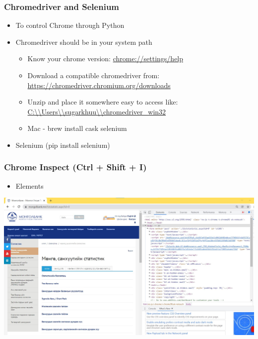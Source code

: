 \documentclass{beamer}
\begin{document}
\begin{frame}
\frametitle{Chromedriver and Selenium}
    \begin{itemize}
        \item To control Chrome through Python
        \item Chromedriver should be in your system path
            \begin{itemize}
                \item Know your chrome version: \url{chrome://settings/help}
                \item Download a compatible chromedriver from: \url{https://chromedriver.chromium.org/downloads}
                \item Unzip and place it somewhere easy to access like: \url{C:\\Users\\sugarkhuu\\chromedriver\_win32}
                \item Mac - brew install cask selenium
            \end{itemize}
        \item Selenium (pip install selenium)
    \end{itemize}
\end{frame}

\begin{frame}
    \frametitle{Chrome Inspect (Ctrl + Shift + I)}
        \begin{itemize}
            \item Elements
        \end{itemize}
\centering
\includegraphics[scale=0.25]{figures/bom.jpg}
\end{frame}
\end{document}
